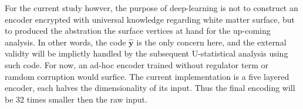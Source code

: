 For the current study howver, the purpose of deep-learning is not to construct an encoder encrypted with universal knowledge regarding white matter surface, but to produced the abstration the surface vertices at hand for the up-coming analysis. In other words, the code $\boldsymbol{\hat{y}}$ is the only concern here, and the external validty will be implictly handled by the subsequent U-statistical analysis using such code. For now, an ad-hoc encoder trained without regulator term or ramdom corruption would surfice. The current implementation is a five layered encoder, each halves the dimensionality of its input. Thus the final encoding will be 32 times smaller then the raw input.
